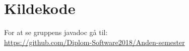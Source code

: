 \chapter{Kildekode}
For at se gruppens javadoc gå til: \\
\url{https://github.com/Diplom-Software2018/Anden-semester}